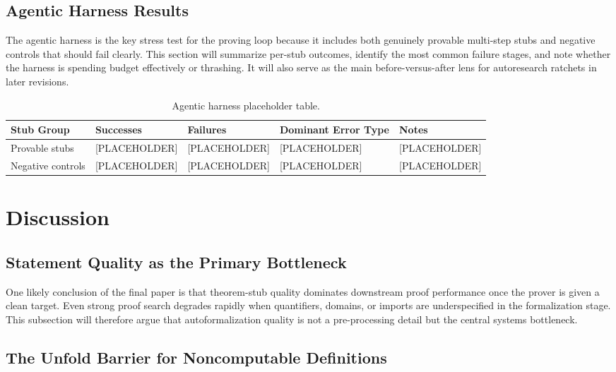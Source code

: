 \documentclass[11pt,letterpaper]{article}
\begin{document}
\subsection{Agentic Harness Results}

The agentic harness is the key stress test for the proving loop because it includes both genuinely provable multi-step stubs and negative controls that should fail clearly. This section will summarize per-stub outcomes, identify the most common failure stages, and note whether the harness is spending budget effectively or thrashing. It will also serve as the main before-versus-after lens for autoresearch ratchets in later revisions.

\begin{table}[h]
\centering
\begin{tabular}{lllll}
\toprule
Stub Group & Successes & Failures & Dominant Error Type & Notes \\
\midrule
Provable stubs & [PLACEHOLDER] & [PLACEHOLDER] & [PLACEHOLDER] & [PLACEHOLDER] \\
Negative controls & [PLACEHOLDER] & [PLACEHOLDER] & [PLACEHOLDER] & [PLACEHOLDER] \\
\bottomrule
\end{tabular}
\caption{Agentic harness placeholder table.}
\end{table}

\section{Discussion}

\subsection{Statement Quality as the Primary Bottleneck}

One likely conclusion of the final paper is that theorem-stub quality dominates downstream proof performance once the prover is given a clean target. Even strong proof search degrades rapidly when quantifiers, domains, or imports are underspecified in the formalization stage. This subsection will therefore argue that autoformalization quality is not a pre-processing detail but the central systems bottleneck.

\subsection{The Unfold Barrier for Noncomputable Definitions}
\end{document}
